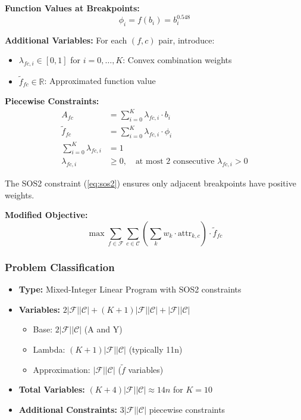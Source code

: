 \documentclass[11pt,a4paper]{article}
\begin{document}
\textbf{Function Values at Breakpoints:}
\begin{equation}
\phi_i = f(b_i) = b_i^{0.548}
\end{equation}

\textbf{Additional Variables:}
For each $(f,c)$ pair, introduce:
\begin{itemize}
    \item $\lambda_{fc,i} \in [0,1]$ for $i = 0,\ldots,K$: Convex combination weights
    \item $\tilde{f}_{fc} \in \mathbb{R}$: Approximated function value
\end{itemize}

\textbf{Piecewise Constraints:}
\begin{align}
A_{fc} &= \sum_{i=0}^{K} \lambda_{fc,i} \cdot b_i \label{eq:pw_area}\\
\tilde{f}_{fc} &= \sum_{i=0}^{K} \lambda_{fc,i} \cdot \phi_i \label{eq:pw_func}\\
\sum_{i=0}^{K} \lambda_{fc,i} &= 1 \label{eq:pw_convex}\\
\lambda_{fc,i} &\geq 0, \quad \text{at most 2 consecutive } \lambda_{fc,i} > 0 \label{eq:sos2}
\end{align}

The SOS2 constraint (\ref{eq:sos2}) ensures only adjacent breakpoints have positive weights.

\textbf{Modified Objective:}
\begin{equation}
\max \sum_{f \in \mathcal{F}} \sum_{c \in \mathcal{C}} \left(\sum_{k} w_k \cdot \text{attr}_{k,c}\right) \cdot \tilde{f}_{fc}
\label{eq:pw_obj}
\end{equation}

\subsubsection{Problem Classification}
\begin{itemize}
    \item \textbf{Type:} Mixed-Integer Linear Program with SOS2 constraints
    \item \textbf{Variables:} $2|\mathcal{F}||\mathcal{C}| + (K+1)|\mathcal{F}||\mathcal{C}| + |\mathcal{F}||\mathcal{C}|$
    \begin{itemize}
        \item Base: $2|\mathcal{F}||\mathcal{C}|$ (A and Y)
        \item Lambda: $(K+1)|\mathcal{F}||\mathcal{C}|$ (typically 11n)
        \item Approximation: $|\mathcal{F}||\mathcal{C}|$ ($\tilde{f}$ variables)
    \end{itemize}
    \item \textbf{Total Variables:} $(K+4)|\mathcal{F}||\mathcal{C}| \approx 14n$ for $K=10$
    \item \textbf{Additional Constraints:} $3|\mathcal{F}||\mathcal{C}|$ piecewise constraints
\end{itemize}
\end{document}
